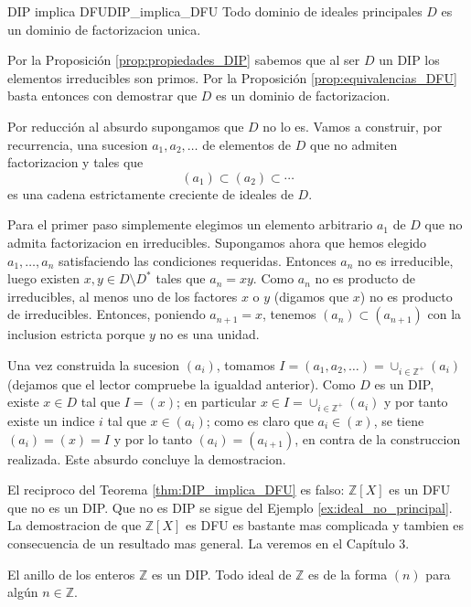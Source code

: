 \begin{theorem}{DIP implica DFU}{DIP_implica_DFU}
Todo dominio de ideales principales \(D\) es un dominio de factorizacion unica.
\end{theorem}

\begin{proofbox}
Por la Proposición \ref{prop:propiedades_DIP} sabemos que al ser $D$ un DIP los elementos irreducibles son primos. Por la Proposición \ref{prop:equivalencias_DFU} basta entonces con demostrar que \(D\) es un dominio de factorizacion.

Por reducción al absurdo supongamos que \(D\) no lo es. Vamos a construir, por recurrencia, una sucesion \(a_1, a_2, \ldots\) de elementos de \(D\) que no admiten factorizacion y tales que
\[
(a_1) \subset (a_2) \subset \cdots
\]
es una cadena estrictamente creciente de ideales de \(D\).

Para el primer paso simplemente elegimos un elemento arbitrario \(a_1\) de \(D\) que no admita factorizacion en irreducibles. Supongamos ahora que hemos elegido \(a_1, \ldots, a_n\) satisfaciendo las condiciones requeridas. Entonces \(a_n\) no es irreducible, luego existen \(x, y \in D \setminus D^*\) tales que \(a_n = xy\). Como \(a_n\) no es producto de irreducibles, al menos uno de los factores \(x\) o \(y\) (digamos que \(x\)) no es producto de irreducibles. Entonces, poniendo \(a_{n+1} = x\), tenemos \((a_n) \subset (a_{n+1})\) con la inclusion estricta porque \(y\) no es una unidad.

Una vez construida la sucesion \((a_i)\), tomamos \(I = (a_1, a_2, \ldots) = \cup_{i \in \mathbb{Z}^+}(a_i)\) (dejamos que el lector compruebe la igualdad anterior). Como \(D\) es un DIP, existe \(x \in D\) tal que \(I = (x)\); en particular \(x \in I = \cup_{i \in \mathbb{Z}^+}(a_i)\) y por tanto existe un indice \(i\) tal que \(x \in (a_i)\); como es claro que \(a_i \in (x)\), se tiene \((a_i) = (x) = I\) y por lo tanto \((a_i) = (a_{i+1})\), en contra de la construccion realizada. Este absurdo concluye la demostracion.
\end{proofbox}

El reciproco del Teorema \ref{thm:DIP_implica_DFU} es falso: \(\mathbb{Z}[X]\) es un DFU que no es un DIP. Que no es DIP se sigue del Ejemplo \ref{ex:ideal_no_principal}. La demostracion de que \(\mathbb{Z}[X]\) es DFU es bastante mas complicada y tambien es consecuencia de un resultado mas general. La veremos en el Capítulo 3.

\begin{example}{}{}
El anillo de los enteros $\mathbb{Z}$ es un DIP. Todo ideal de $\mathbb{Z}$ es de la forma $(n)$ para algún $n \in \mathbb{Z}$.
\end{example}

